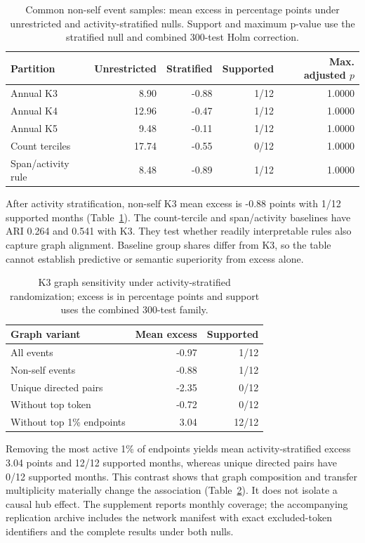 \documentclass[journal,letterpaper]{IEEEtran}
\begin{document}
\begin{table}[!t]
\centering\footnotesize
\caption{Common non-self event samples: mean excess in percentage points under unrestricted and activity-stratified nulls. Support and maximum p-value use the stratified null and combined 300-test Holm correction.}
\label{tab:conditionednetwork}
\begin{tabular}{lrrrr}
\toprule
Partition & Unrestricted & Stratified & Supported & Max. adjusted $p$ \\
\midrule
Annual K3 & 8.90 & -0.88 & 1/12 & 1.0000 \\
Annual K4 & 12.96 & -0.47 & 1/12 & 1.0000 \\
Annual K5 & 9.48 & -0.11 & 1/12 & 1.0000 \\
Count terciles & 17.74 & -0.55 & 0/12 & 1.0000 \\
Span/activity rule & 8.48 & -0.89 & 1/12 & 1.0000 \\
\bottomrule
\end{tabular}
\end{table}
After activity stratification, non-self K3 mean excess is -0.88 points with 1/12 supported months (Table~\ref{tab:conditionednetwork}). The count-tercile and span/activity baselines have ARI 0.264 and 0.541 with K3. They test whether readily interpretable rules also capture graph alignment. Baseline group shares differ from K3, so the table cannot establish predictive or semantic superiority from excess alone.

\begin{table}[t]
\centering\footnotesize
\caption{K3 graph sensitivity under activity-stratified randomization; excess is in percentage points and support uses the combined 300-test family.}
\label{tab:graphsensitivity}
\begin{tabular}{lrr}
\toprule
Graph variant & Mean excess & Supported \\
\midrule
All events & -0.97 & 1/12 \\
Non-self events & -0.88 & 1/12 \\
Unique directed pairs & -2.35 & 0/12 \\
Without top token & -0.72 & 0/12 \\
Without top 1\% endpoints & 3.04 & 12/12 \\
\bottomrule
\end{tabular}
\end{table}
Removing the most active 1\% of endpoints yields mean activity-stratified excess 3.04 points and 12/12 supported months, whereas unique directed pairs have 0/12 supported months. This contrast shows that graph composition and transfer multiplicity materially change the association (Table~\ref{tab:graphsensitivity}). It does not isolate a causal hub effect. The supplement reports monthly coverage; the accompanying replication archive includes the network manifest with exact excluded-token identifiers and the complete results under both nulls.
\end{document}
